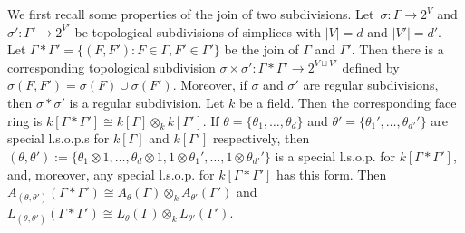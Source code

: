 We first recall some properties of the join of two subdivisions. 
Let~$\sigma\colon \Gamma \to 2^V$ and $\sigma'\colon \Gamma' \to 2^{V'}$ be topological subdivisions of simplices with $|V| = d$ and $|V'| = d'$. Let $\Gamma * \Gamma' = \{ (F,F') : F \in \Gamma, F' \in \Gamma' \}$ be the join of $\Gamma$ and $\Gamma'$. Then there is a corresponding topological subdivision 
$\sigma \times \sigma' \colon \Gamma * \Gamma' \to 2^{V \sqcup V'}$ defined by $\sigma(F,F') = \sigma(F) \cup \sigma(F')$. Moreover, if $\sigma$ and $\sigma'$ are regular subdivisions, then $\sigma * \sigma'$ is a regular subdivision. Let $k$ be a field.  Then the corresponding face ring is $k[\Gamma * \Gamma'] \cong k[\Gamma] \otimes_k k[\Gamma']$. If 
$\theta = \{ \theta_1, \dotsc, \theta_d \}$ and $\theta' = \{ \theta_1', \dotsc, \theta_{d'}' \}$ are special l.s.o.p.s for  $k[\Gamma]$ and $k[\Gamma']$ respectively, then $(\theta, \theta') := \{ \theta_1 \otimes 1, \dotsc, \theta_d \otimes 1,  1 \otimes \theta_1', \dotsc, 1 \otimes \theta_{d'}' \}$ is a special l.s.o.p. for $k[\Gamma * \Gamma']$, and,   moreover,  any special l.s.o.p. for $k[\Gamma * \Gamma']$ has this form. Then $A_{(\theta, \theta')}(\Gamma * \Gamma') \cong  A_\theta(\Gamma) \otimes_k A_{\theta'}(\Gamma')$ and  $L_{(\theta, \theta')}(\Gamma * \Gamma') \cong  L_\theta(\Gamma) \otimes_k L_{\theta'}(\Gamma')$. 

